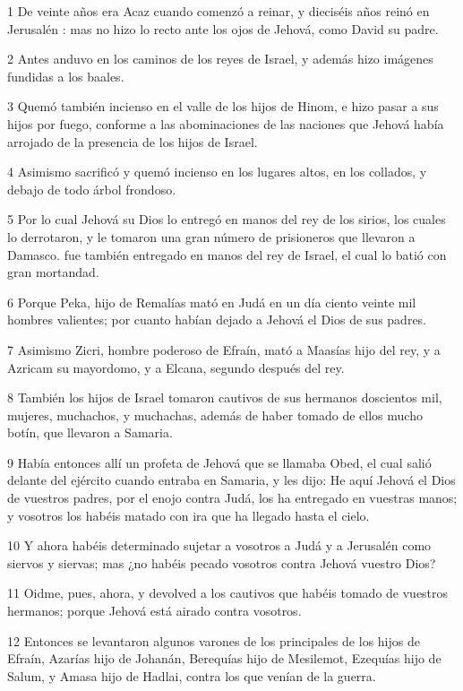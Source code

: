 \par 1 De veinte años era Acaz cuando comenzó a reinar, y dieciséis años reinó en Jerusalén : mas no hizo lo recto ante los ojos de Jehová, como David su padre.
\par 2 Antes anduvo en los caminos de los reyes de Israel, y además hizo imágenes fundidas a los baales.
\par 3 Quemó también incienso en el valle de los hijos de Hinom, e hizo pasar a sus hijos por fuego, conforme a las abominaciones de las naciones que Jehová había arrojado de la presencia de los hijos de Israel.
\par 4 Asimismo sacrificó y quemó incienso en los lugares altos, en los collados, y debajo de todo árbol frondoso.
\par 5 Por lo cual Jehová su Dios lo entregó en manos del rey de los sirios, los cuales lo derrotaron, y le tomaron una gran número de prisioneros que llevaron a Damasco. fue también entregado en manos del rey de Israel, el cual lo batió con gran mortandad.
\par 6 Porque Peka, hijo de Remalías mató en Judá en un día ciento veinte mil hombres valientes; por cuanto habían dejado a Jehová el Dios de sus padres. 
\par 7 Asimismo Zicri, hombre poderoso de Efraín, mató a Maasías hijo del rey, y a Azricam su mayordomo, y a Elcana, segundo después del rey.
\par 8 También los hijos de Israel tomaron cautivos de sus hermanos doscientos mil, mujeres, muchachos, y muchachas, además de haber tomado de ellos mucho botín, que llevaron a Samaria.
\par 9 Había entonces allí un profeta de Jehová que se llamaba Obed, el cual salió delante del ejército cuando entraba en Samaria, y les dijo: He aquí Jehová el Dios de vuestros padres, por el enojo contra Judá, los ha entregado en vuestras manos; y vosotros los habéis matado con ira que ha llegado hasta el cielo.
\par 10 Y ahora habéis determinado sujetar a vosotros a Judá y a Jerusalén  como siervos y siervas; mas ¿no habéis pecado vosotros contra Jehová vuestro Dios?
\par 11 Oidme, pues, ahora, y devolved a los cautivos que habéis tomado de vuestros hermanos; porque Jehová está airado contra vosotros.
\par 12 Entonces se levantaron algunos varones de los principales de los hijos de Efraín, Azarías hijo de Johanán,  Berequías hijo de Mesilemot, Ezequías hijo de Salum, y Amasa hijo de Hadlai, contra los que venían de la guerra.
